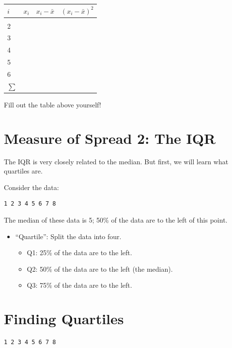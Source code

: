 \documentclass[
  letterpaper,
  DIV=11,
  numbers=noendperiod]{scrreprt}
\providecommand{\tightlist}{%
  \setlength{\itemsep}{0pt}\setlength{\parskip}{0pt}}\usepackage{longtable,booktabs,array}
\begin{document}
\begin{longtable}[]{@{}llll@{}}
\toprule\noalign{}
\(i\) & \(x_i\) & \(x_i - \bar x\) & \((x_i - \bar x)^2\) \\
\midrule\noalign{}
\endhead
\bottomrule\noalign{}
\endlastfoot
1 & & & \\
2 & & & \\
3 & & & \\
4 & & & \\
5 & & & \\
6 & & & \\
\(\sum\) & & & \\
\end{longtable}

Fill out the table above yourself!

\hypertarget{measure-of-spread-2-the-iqr}{%
\section{Measure of Spread 2: The
IQR}\label{measure-of-spread-2-the-iqr}}

The IQR is very closely related to the median. But first, we will learn
what quartiles are.

Consider the data:

\begin{verbatim}
1 2 3 4 5 6 7 8
\end{verbatim}

The median of these data is 5; 50\% of the data are to the left of this
point.

\begin{itemize}
\tightlist
\item
  ``Quartile'': Split the data into four.

  \begin{itemize}
  \tightlist
  \item
    Q1: 25\% of the data are to the left.
  \item
    Q2: 50\% of the data are to the left (the median).
  \item
    Q3: 75\% of the data are to the left.
  \end{itemize}
\end{itemize}

\hypertarget{finding-quartiles}{%
\section{Finding Quartiles}\label{finding-quartiles}}

\begin{verbatim}
1 2 3 4 5 6 7 8
\end{verbatim}
\end{document}
